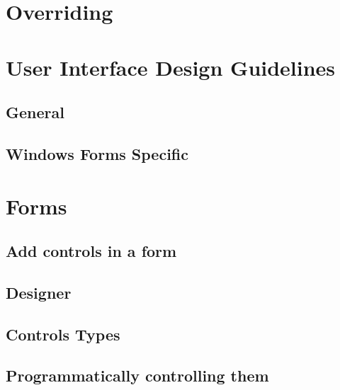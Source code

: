 \documentclass[
]{book}
\begin{document}
\hypertarget{overriding}{%
\section{Overriding}\label{overriding}}

\hypertarget{user-interface-design-guidelines}{%
\section{User Interface Design Guidelines}\label{user-interface-design-guidelines}}

\hypertarget{general}{%
\subsection{General}\label{general}}

\hypertarget{windows-forms-specific}{%
\subsection{Windows Forms Specific}\label{windows-forms-specific}}

\hypertarget{forms}{%
\section{Forms}\label{forms}}

\hypertarget{add-controls-in-a-form}{%
\subsection{Add controls in a form}\label{add-controls-in-a-form}}

\hypertarget{designer}{%
\subsection{Designer}\label{designer}}

\hypertarget{controls-types}{%
\subsection{Controls Types}\label{controls-types}}

\hypertarget{programmatically-controlling-them}{%
\subsection{Programmatically controlling them}\label{programmatically-controlling-them}}
\end{document}
